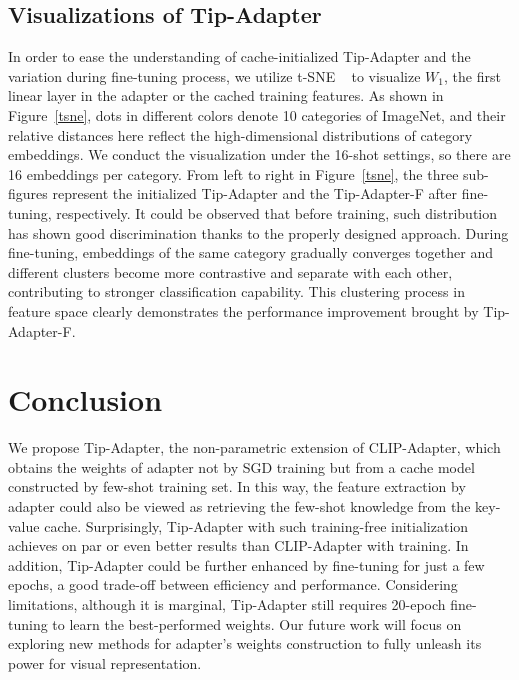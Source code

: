 \documentclass[10pt,twocolumn,letterpaper]{article}
\begin{document}
\subsection{Visualizations of Tip-Adapter}
In order to ease the understanding of cache-initialized Tip-Adapter and the variation during fine-tuning process, we utilize t-SNE ~\cite{radford2021learning} to visualize $W_1$, the first linear layer in the adapter or the cached training features. As shown in Figure~\ref{tsne}, dots in different colors denote 10 categories of ImageNet, and their relative distances here reflect the high-dimensional distributions of category embeddings. We conduct the visualization under the 16-shot settings, so there are 16 embeddings per category. 
From left to right in Figure~\ref{tsne}, the three sub-figures represent the initialized Tip-Adapter and the Tip-Adapter-F after fine-tuning, respectively. It could be observed that before training, such distribution has shown good discrimination thanks to the properly designed approach. During fine-tuning, embeddings of the same category gradually converges together and different clusters become more contrastive and separate with each other, contributing to stronger classification capability. This clustering process in feature space clearly demonstrates the performance improvement brought by Tip-Adapter-F.


\section{Conclusion}
\label{sec:conclusion}

We propose Tip-Adapter, the non-parametric extension of CLIP-Adapter, which obtains the weights of adapter not by SGD training but from a cache model constructed by few-shot training set. In this way, the feature extraction by adapter could also be viewed as retrieving the few-shot knowledge from the key-value cache. Surprisingly, Tip-Adapter with such training-free initialization achieves on par or even better results than CLIP-Adapter with training. In addition, Tip-Adapter could be further enhanced by fine-tuning for just a few epochs, a good trade-off between efficiency and performance. Considering limitations, although it is marginal, Tip-Adapter still requires 20-epoch fine-tuning to learn the best-performed weights. Our future work will focus on exploring new methods for adapter's weights construction to fully unleash its power for visual representation.

{\small


}
\end{document}
